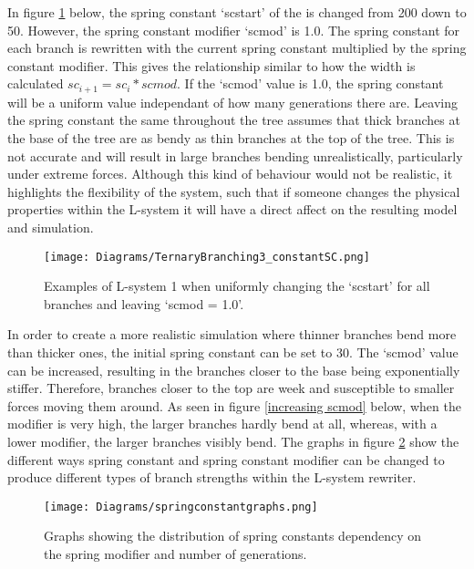 In figure \ref{constant spring} below, the spring constant `scstart' of the is changed from 200 down to 50.  However, the spring constant modifier `scmod' is 1.0. The spring constant for each branch is rewritten with the current spring constant multiplied by the spring constant modifier. This gives the relationship similar to how the width is calculated $sc_{i+1} = sc_i * scmod$. If the `scmod' value is 1.0, the spring constant will be a uniform value independant of how many generations there are. Leaving the spring constant the same throughout the tree assumes that thick branches at the base of the tree are as bendy as thin branches at the top of the tree. This is not accurate and will result in large branches bending unrealistically, particularly under extreme forces. Although this kind of behaviour would not be realistic, it highlights the flexibility of the system, such that if someone changes the physical properties within the L-system it will have a direct affect on the resulting model and simulation.

\begin{figure}[htbp]
	{\centering
		\vspace{7px}
		\texttt{[image: Diagrams/TernaryBranching3\_constantSC.png]}
		\caption{Examples of L-system 1 when uniformly changing the `scstart' for all branches and leaving `scmod = 1.0'.}\label{constant spring}
	}
\end{figure}
\FloatBarrier

\noindent
In order to create a more realistic simulation where thinner branches bend more than thicker ones, the initial spring constant can be set to 30. The `scmod' value can be increased, resulting in the branches closer to the base being exponentially stiffer. Therefore, branches closer to the top are week and susceptible to smaller forces moving them around. As seen in figure \ref{increasing scmod} below, when the modifier is very high, the larger branches hardly bend at all, whereas, with a lower modifier, the larger branches visibly bend. The graphs in figure \ref{spring constant graphs} show the different ways spring constant and spring constant modifier can be changed to produce different types of branch strengths within the L-system rewriter.

\begin{figure}[htbp]
	{\centering
		\vspace{7px}
		\texttt{[image: Diagrams/springconstantgraphs.png]}
		\caption{Graphs showing the distribution of spring constants dependency on the spring modifier and number of generations.}\label{spring constant graphs}
	}
\end{figure}
\FloatBarrier

